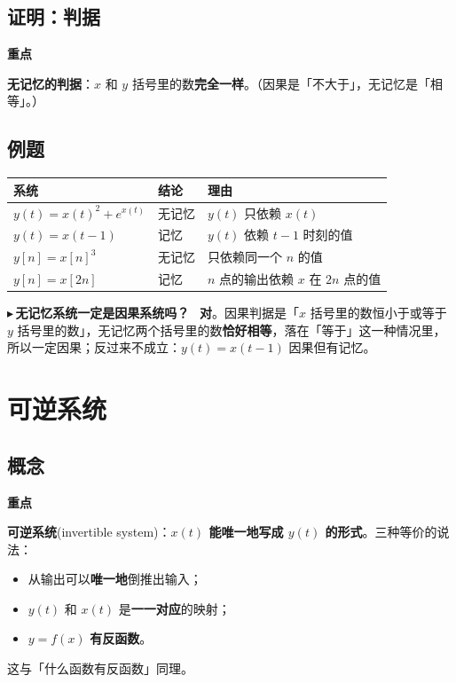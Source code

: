 \documentclass[UTF8,a4paper,11pt]{ctexart}
\newenvironment{remember}{\begin{rememberbox}\textbf{重点}\par\smallskip}{\end{rememberbox}}
\newcounter{ex}[section]
\newcommand{\point}[1]{\par\addvspace{1ex}\noindent\textcolor{ptteal}{$\blacktriangleright$\,\textbf{#1}}\ }
\begin{document}
\subsection{证明：判据}
\begin{remember}
\textbf{无记忆的判据}：$x$ 和 $y$ 括号里的数\textbf{完全一样}。（因果是「不大于」，无记忆是「相等」。）
\end{remember}

\subsection{例题}
\begin{center}
\begin{tabular}{@{}lll@{}}
\toprule
系统 & 结论 & 理由\\
\midrule
$y(t)=x(t)^2+e^{x(t)}$ & 无记忆 & $y(t)$ 只依赖 $x(t)$\\
$y(t)=x(t-1)$ & 记忆 & $y(t)$ 依赖 $t-1$ 时刻的值\\
$y[n]=x[n]^3$ & 无记忆 & 只依赖同一个 $n$ 的值\\
$y[n]=x[2n]$ & 记忆 & $n$ 点的输出依赖 $x$ 在 $2n$ 点的值\\
\bottomrule
\end{tabular}
\end{center}

\point{无记忆系统一定是因果系统吗？}
\textbf{对}。因果判据是「$x$ 括号里的数恒小于或等于 $y$ 括号里的数」，无记忆两个括号里的数\textbf{恰好相等}，落在「等于」这一种情况里，所以一定因果；反过来不成立：$y(t)=x(t-1)$ 因果但有记忆。

\section{可逆系统}
\subsection{概念}
\begin{remember}
\textbf{可逆系统}(invertible system)：\textbf{$x(t)$ 能唯一地写成 $y(t)$ 的形式}。三种等价的说法：
\begin{itemize}[nosep]
\item 从输出可以\textbf{唯一地}倒推出输入；
\item $y(t)$ 和 $x(t)$ 是\textbf{一一对应}的映射；
\item $y=f(x)$ \textbf{有反函数}。
\end{itemize}
\end{remember}
这与「什么函数有反函数」同理。
\end{document}

